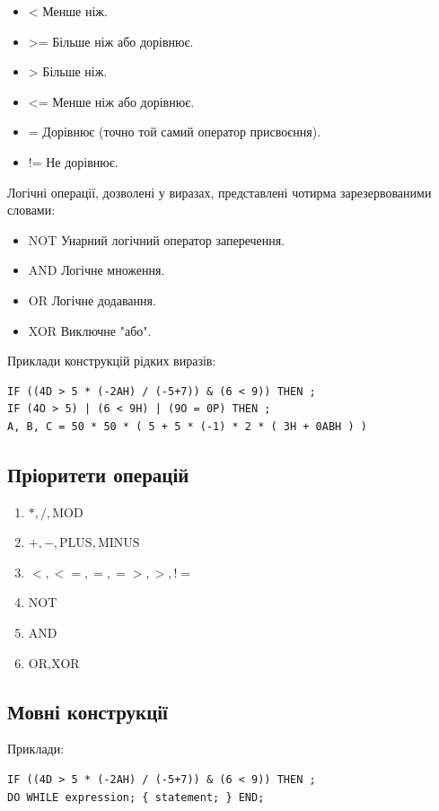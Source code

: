 \documentclass{memoir}
\begin{document}
\begin{itemize}
\item < Менше ніж.
\item >= Більше ніж або дорівнює.
\item > Більше ніж.
\item <= Менше ніж або дорівнює.
\item = Дорівнює (точно той самий оператор присвоєння).
\item != Не дорівнює.
\end{itemize}

Логічні операції, дозволені у виразах, представлені чотирма зарезервованими словами:

\begin{itemize}
\item NOT Унарний логічний оператор заперечення.
\item AND Логічне множення.
\item OR Логічне додавання.
\item XOR Виключне "або".
\end{itemize}

Приклади конструкцій рідких виразів:

\begin{lstlisting}[mathescape=true]
IF ((4D > 5 * (-2AH) / (-5+7)) & (6 < 9)) THEN ;
IF (4O > 5) | (6 < 9H) | (9O = 0P) THEN ;
A, B, C = 50 * 50 * ( 5 + 5 * (-1) * 2 * ( 3H + 0ABH ) )
\end{lstlisting}

\subsection{Пріоритети операцій}
\begin{enumerate}
    \item \( *, /, \text{MOD} \)
    \item \( +, -, \text{PLUS}, \text{MINUS} \)
    \item \( <, <=, =, =>, >, != \)
    \item \( \text{NOT} \)
    \item \( \text{AND} \)
    \item \( \text{OR}, \text{XOR} \)
\end{enumerate}

\subsection{Мовні конструкції}
Приклади:
\begin{lstlisting}
IF ((4D > 5 * (-2AH) / (-5+7)) & (6 < 9)) THEN ;
DO WHILE expression; { statement; } END;
\end{lstlisting}
\end{document}
